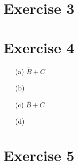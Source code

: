 \documentclass[10pt,twoside,a4paper]{article}
\begin{document}
\section*{Exercise 3}



\section*{Exercise 4}
\begin{enumerate}
\item[(a)]
$\bar{B}+C$
\item[(b)]
$ $
\item[(c)]
$\bar{B}+C$
\item[(d)]
$ $
\end{enumerate}
\section*{Exercise 5}
\end{document}
